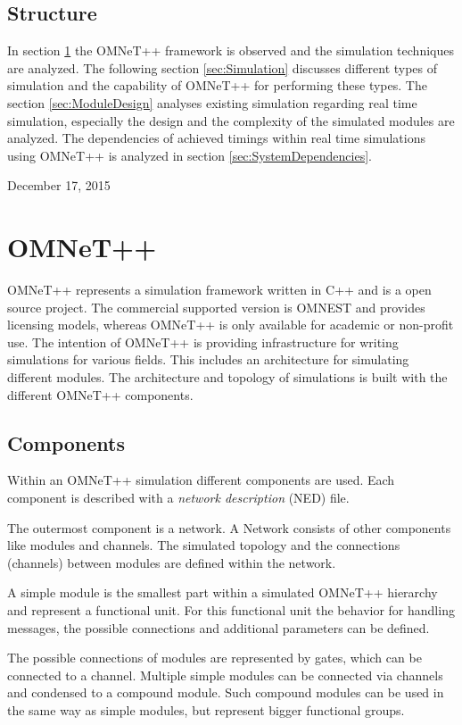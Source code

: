 \documentclass[journal]{IEEEtran}
\begin{document}
\subsection{Structure}
In section \ref{sec:OMNeT} the OMNeT++ framework is observed and the simulation techniques are analyzed.
The following section \ref{sec:Simulation} discusses different types of simulation and the capability of OMNeT++ for performing these types.
The section \ref{sec:ModuleDesign} analyses existing simulation regarding real time simulation, especially the design and the complexity of the simulated modules are analyzed.
The dependencies of achieved timings within real time simulations using OMNeT++ is analyzed in section \ref{sec:SystemDependencies}.

 
\hfill December 17, 2015

\section{OMNeT++}
\label{sec:OMNeT}
OMNeT++ represents a simulation framework written in C++ and is a open source project.
The commercial supported version is OMNEST and provides licensing models, whereas OMNeT++ is only available for academic or non-profit use.
The intention of OMNeT++ is providing infrastructure for writing simulations for various fields.
This includes an architecture for simulating different modules.
The architecture and topology of simulations is built with the different OMNeT++ components.

\subsection{Components}
Within an OMNeT++ simulation different components are used.
Each component is described with a \emph{network description} (NED) file.

The outermost component is a network.
A Network consists of other components like modules and channels.
The simulated topology and the connections (channels) between modules are defined within the network.

A simple module is the smallest part within a simulated OMNeT++ hierarchy and represent a functional unit.
For this functional unit the behavior for handling messages, the possible connections and additional parameters can be defined.

The possible connections of modules are represented by gates, which can be connected to a channel.
Multiple simple modules can be connected via channels and condensed to a compound module.
Such compound modules can be used in the same way as simple modules, but represent bigger functional groups.
\end{document}
